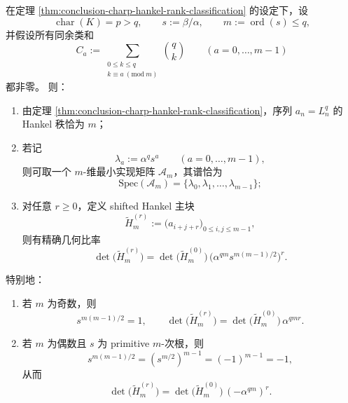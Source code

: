 \begin{theorem}\label{thm:conclusion-lucas-charp-shifted-hankel-geometric-ratio}
在定理 \ref{thm:conclusion-charp-hankel-rank-classification} 的设定下，设
\[
\operatorname{char}(K)=p>q,\qquad
s:=\beta/\alpha,\qquad
m:=\operatorname{ord}(s)\le q,
\]
并假设所有同余类和
\[
C_a:=\sum_{\substack{0\le k\le q\\ k\equiv a\ (\mathrm{mod}\ m)}}\binom{q}{k}
\qquad(a=0,\dots,m-1)
\]
都非零。
则：
\begin{enumerate}
  \item 由定理 \ref{thm:conclusion-charp-hankel-rank-classification}，序列 \(a_n=L_n^q\) 的 Hankel 秩恰为 \(m\)；
  \item 若记
  \[
  \lambda_a:=\alpha^q s^a\qquad(a=0,\dots,m-1),
  \]
  则可取一个 \(m\)-维最小实现矩阵 \(\mathcal A_m\)，其谱恰为
  \[
  \mathrm{Spec}(\mathcal A_m)=\{\lambda_0,\lambda_1,\dots,\lambda_{m-1}\};
  \]
  \item 对任意 \(r\ge 0\)，定义 shifted Hankel 主块
  \[
  \widetilde H_m^{(r)}:=\bigl(a_{i+j+r}\bigr)_{0\le i,j\le m-1},
  \]
  则有精确几何比率
  \[
  \boxed{\;
  \det\!\bigl(\widetilde H_m^{(r)}\bigr)
  =
  \det\!\bigl(\widetilde H_m^{(0)}\bigr)\,
  \bigl(\alpha^{qm}s^{m(m-1)/2}\bigr)^r.\;}
  \]
\end{enumerate}
特别地：
\begin{enumerate}
  \item 若 \(m\) 为奇数，则
  \[
  s^{m(m-1)/2}=1,
  \qquad
  \det\!\bigl(\widetilde H_m^{(r)}\bigr)
  =
  \det\!\bigl(\widetilde H_m^{(0)}\bigr)\,\alpha^{qmr}.
  \]
  \item 若 \(m\) 为偶数且 \(s\) 为 primitive \(m\)-次根，则
  \[
  s^{m(m-1)/2}=(s^{m/2})^{m-1}=(-1)^{m-1}=-1,
  \]
  从而
  \[
  \det\!\bigl(\widetilde H_m^{(r)}\bigr)
  =
  \det\!\bigl(\widetilde H_m^{(0)}\bigr)\,(-\alpha^{qm})^r.
  \]
\end{enumerate}
\end{theorem}
